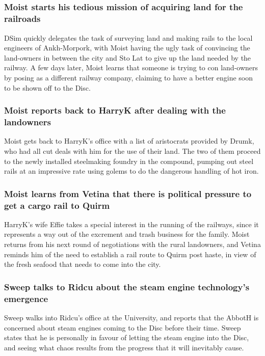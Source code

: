 \subsection{}
\subsubsection{\Gls{Moist} starts his tedious mission of acquiring land for the railroads}
\Gls{DSim} quickly delegates the task of surveying land and making rails to the local engineers of
Ankh-Morpork, with \Gls{Moist} having the ugly task of convincing the land-owners in between
the city and Sto Lat to give up the land needed by the railway. A few days later, \Gls{Moist} learns
that someone is trying to con land-owners by posing as a different railway company, claiming to have
a better engine soon to be shown off to the Disc.

\subsubsection{\Gls{Moist} reports back to \Gls{HarryK} after dealing with the landowners}
\Gls{Moist} gets back to \Gls{HarryK}'s office with a list of aristocrats provided by \Gls{Drumk},
who had all cut deals with him for the use of their land. The two of them proceed to the newly
installed steelmaking foundry in the compound, pumping out steel rails at an impressive rate using
golems to do the dangerous handling of hot iron.

\subsubsection{\Gls{Moist} learns from \Gls{Vetina} that there is political pressure to get a
    cargo rail to Quirm}
\Gls{HarryK}'s wife \Gls{Effie} takes a special interest in the running of the railways, since
it represents a way out of the excrement and trash business for the family. \Gls{Moist} returns from
his next round of negotiations with the rural landowners, and \Gls{Vetina} reminds him of the need
to establish a rail route to Quirm post haste, in view of the fresh seafood that needs to come into
the city.

\subsubsection{\Gls{Sweep} talks to \Gls{Ridcu} about the steam engine technology's emergence}
\Gls{Sweep} walks into \Gls{Ridcu}'s office at the University, and reports that the \Gls{AbbotH}
is concerned about steam engines coming to the Disc before their time. \Gls{Sweep} states that he
is personally in favour of letting the steam engine into the Disc, and seeing what chaos results
from the progress that it will inevitably cause.

